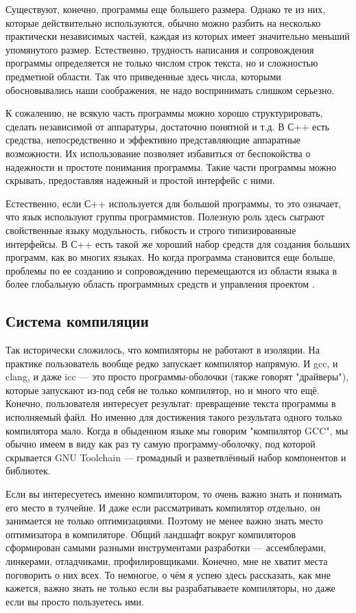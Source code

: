Существуют, конечно, программы еще большего размера. Однако те из них, которые действительно используются, обычно можно разбить на несколько практически независимых частей, каждая из которых имеет значительно меньший упомянутого размер. Естественно, трудность написания и сопровождения программы определяется не только числом строк текста, но и сложностью предметной области. Так что приведенные здесь числа, которыми обосновывались наши соображения, не надо воспринимать слишком серьезно.

К сожалению, не всякую часть программы можно хорошо структурировать, сделать независимой от аппаратуры, достаточно понятной и т.д. В С++ есть средства, непосредственно и эффективно представляющие аппаратные возможности. Их использование позволяет избавиться от беспокойства о надежности и простоте понимания программы. Такие части программы можно скрывать, предоставляя надежный и простой интерфейс с ними.

Естественно, если С++ используется для большой программы, то это означает, что язык используют группы программистов. Полезную роль здесь сыграют свойственные языку модульность, гибкость и строго типизированные интерфейсы. В С++ есть такой же хороший набор средств для создания больших программ, как во многих языках. Но когда программа становится еще больше, проблемы по ее созданию и сопровождению перемещаются из области языка в более глобальную область программных средств и управления проектом \cite{StroustrupCpp}.


\subsection{Система компиляции}

Так исторически сложилось, что компиляторы не работают в изоляции. На практике пользователь вообще редко запускает компилятор напрямую. И gcc, и clang, и даже icc — это просто программы-оболочки (также говорят "драйверы"), которые запускают из-под себя не только компилятор, но и много что ещё. Конечно, пользователя интересует результат: превращение текста программы в исполняемый файл. Но именно для достижения такого результата одного только компилятора мало. Когда в обыденном языке мы говорим "компилятор GCC", мы обычно имеем в виду как раз ту самую программу-оболочку, под которой скрывается GNU Toolchain — громадный и разветвлённый набор компонентов и библиотек.

Если вы интересуетесь именно компилятором, то очень важно знать и понимать его место в тулчейне. И даже если рассматривать компилятор отдельно, он занимается не только оптимизациями. Поэтому не менее важно знать место оптимизатора в компиляторе.
Общий ландшафт вокруг компиляторов сформирован самыми разными инструментами разработки — ассемблерами, линкерами, отладчиками, профилировщиками. Конечно, мне не хватит места поговорить о них всех. То немногое, о чём я успею здесь рассказать, как мне кажется, важно знать не только если вы разрабатываете компиляторы, но даже если вы просто пользуетесь ими.

